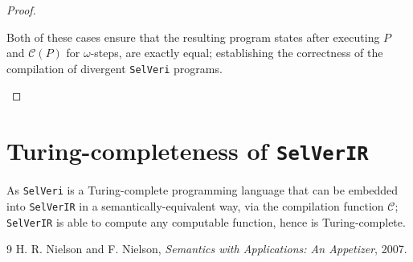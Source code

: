 \documentclass{article}
\begin{document}
\begin{proof}
\begin{itemize}
        Both of these cases ensure that the resulting program states after executing $P$ and $\mathcal{C}(P)$ for $\omega$-steps, are exactly equal; establishing the correctness of the compilation of divergent \texttt{SelVeri} programs.
        
    \end{itemize}
\end{proof}

\section{Turing-completeness of \texttt{SelVerIR}}

As \texttt{SelVeri} is a Turing-complete programming language that can be embedded into \texttt{SelVerIR} in a semantically-equivalent way, via the compilation function $\mathcal{C}$; \texttt{SelVerIR} is able to compute any computable function, hence is Turing-complete.

\newpage
\begin{thebibliography}{9}
 H. R. Nielson and F. Nielson, \emph{Semantics with Applications: An Appetizer}, 2007.
\end{thebibliography}
\end{document}

